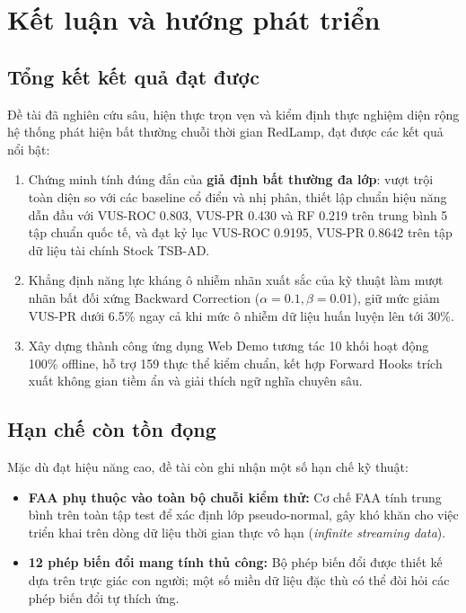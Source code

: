 \documentclass[sigconf,nonacm]{acmart}
\begin{document}
\section{Kết luận và hướng phát triển}

\subsection{Tổng kết kết quả đạt được}

Đề tài đã nghiên cứu sâu, hiện thực trọn vẹn và kiểm định thực nghiệm diện rộng hệ thống phát hiện bất thường chuỗi thời gian RedLamp, đạt được các kết quả nổi bật:
\begin{enumerate}[leftmargin=*, itemsep=2pt, parsep=0pt]
    \item Chứng minh tính đúng đắn của \textbf{giả định bất thường đa lớp}: vượt trội toàn diện so với các baseline cổ điển và nhị phân, thiết lập chuẩn hiệu năng dẫn đầu với VUS-ROC 0.803, VUS-PR 0.430 và RF 0.219 trên trung bình 5 tập chuẩn quốc tế, và đạt kỷ lục VUS-ROC 0.9195, VUS-PR 0.8642 trên tập dữ liệu tài chính Stock TSB-AD.
    \item Khẳng định năng lực kháng ô nhiễm nhãn xuất sắc của kỹ thuật làm mượt nhãn bất đối xứng Backward Correction ($\alpha=0.1, \beta=0.01$), giữ mức giảm VUS-PR dưới 6.5\% ngay cả khi mức ô nhiễm dữ liệu huấn luyện lên tới 30\%.
    \item Xây dựng thành công ứng dụng Web Demo tương tác 10 khối hoạt động 100\% offline, hỗ trợ 159 thực thể kiểm chuẩn, kết hợp Forward Hooks trích xuất không gian tiềm ẩn và giải thích ngữ nghĩa chuyên sâu.
\end{enumerate}

\subsection{Hạn chế còn tồn đọng}

Mặc dù đạt hiệu năng cao, đề tài còn ghi nhận một số hạn chế kỹ thuật:
\begin{itemize}[leftmargin=*, itemsep=2pt, parsep=0pt]
    \item \textbf{FAA phụ thuộc vào toàn bộ chuỗi kiểm thử:} Cơ chế FAA tính trung bình trên toàn tập test để xác định lớp pseudo-normal, gây khó khăn cho việc triển khai trên dòng dữ liệu thời gian thực vô hạn (\textit{infinite streaming data}).
    \item \textbf{12 phép biến đổi mang tính thủ công:} Bộ phép biến đổi được thiết kế dựa trên trực giác con người; một số miền dữ liệu đặc thù có thể đòi hỏi các phép biến đổi tự thích ứng.
\end{itemize}
\end{document}
